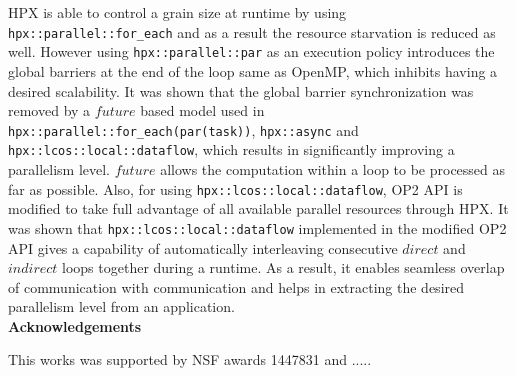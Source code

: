 \documentclass[conference]{IEEEtran}
\begin{document}
HPX is able to control a grain size at runtime by using \texttt{hpx::parallel::for\_each} and as a result the resource starvation is reduced as well. However using \texttt{hpx::parallel::par} as an execution policy introduces the global barriers at the end of the loop same as OpenMP, which inhibits having a desired scalability. It was shown that the global barrier synchronization was removed by a $future$ based model used in \texttt{hpx::parallel::for\_each(par(task))}, \texttt{hpx::async} and \texttt{hpx::lcos::local::dataflow}, which results in significantly improving a parallelism level. $future$ allows the computation within a loop to be processed as far as possible. Also, for using \texttt{hpx::lcos::local::dataflow}, OP2 API is modified to take full advantage of all available parallel resources through HPX. It was shown that \texttt{hpx::lcos::local::dataflow} implemented in the modified OP2 API gives a capability of automatically interleaving consecutive $direct$ and $indirect$ loops together during a runtime. As a result, it enables seamless overlap of communication with communication and helps in extracting the desired parallelism level from an application. \\

\noindent
\textbf{Acknowledgements}

 This works was supported by NSF awards 1447831 and .....




 




\end{document}
